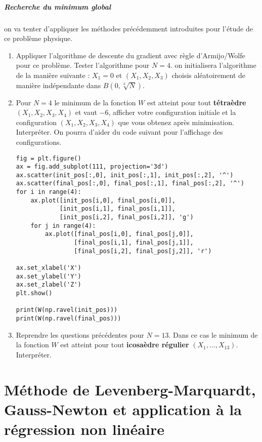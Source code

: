 \documentclass[a4paper,french,12pt]{article}
\begin{document}
\subparagraph{Recherche du minimum global} on va tenter d'appliquer les méthodes précédemment introduites pour l'étude de ce problème physique.

\begin{enumerate}
\item Appliquer l'algorithme de descente du gradient avec règle d'Armijo/Wolfe pour ce problème. Tester l'algorithme pour $N = 4$. on initialisera l'algorithme de la manière suivante : $X_1 = 0$ et $(X_1,X_2,X_3)$ choisis aléatoirement de manière indépendante dans $B(0, \sqrt[3]{N})$. 
\item Pour $N = 4$ le minimum de la fonction $W$ est atteint pour tout \textbf{tétraèdre} $(X_1,X_2,X_3,X_4)$ et vaut $-6$, afficher votre configuration initiale et la configuration $(X_1,X_2,X_3,X_4)$ que vous obtenez après minimisation. Interpréter.
  On pourra d'aider du code suivant pour l'affichage des configurations.
  \begin{lstlisting}
fig = plt.figure()
ax = fig.add_subplot(111, projection='3d')
ax.scatter(init_pos[:,0], init_pos[:,1], init_pos[:,2], '^')
ax.scatter(final_pos[:,0], final_pos[:,1], final_pos[:,2], '^')
for i in range(4):
    ax.plot([init_pos[i,0], final_pos[i,0]],
            [init_pos[i,1], final_pos[i,1]],
            [init_pos[i,2], final_pos[i,2]], 'g')
    for j in range(4):
        ax.plot([final_pos[i,0], final_pos[j,0]], 
                [final_pos[i,1], final_pos[j,1]],
                [final_pos[i,2], final_pos[j,2]], 'r')

ax.set_xlabel('X')
ax.set_ylabel('Y')
ax.set_zlabel('Z')
plt.show()

print(W(np.ravel(init_pos)))
print(W(np.ravel(final_pos)))
\end{lstlisting}
\item Reprendre les questions précédentes pour $N = 13$. Dans ce cas le minimum de la fonction $W$ est atteint pour tout \textbf{icosaèdre régulier} $(X_1, \dots, X_{13})$. Interpréter.
\end{enumerate}
\section{Méthode de Levenberg-Marquardt, Gauss-Newton et application à la régression non linéaire}
%
\end{document}
